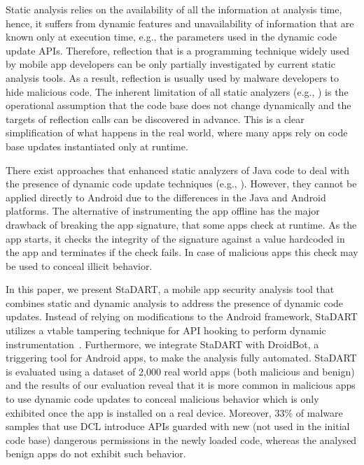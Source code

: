 Static analysis relies on the availability of all the information at analysis time, hence, it suffers  from dynamic features and unavailability of information that are known only at execution time, e.g., the parameters used in the dynamic code update APIs. Therefore, reflection that is a programming technique widely used by mobile app developers can be only partially investigated by current  static analysis tools. As a result, reflection is usually used by malware developers to hide malicious code. The inherent limitation of  all static analyzers  (e.g., \cite{FlowDroid_Arzt2014,Saaf_Hoffmann2013}) is the operational assumption  that the code base does not change dynamically and the targets of reflection calls can be discovered in advance. This is a clear simplification of what happens in the real world, where many apps rely on code base updates instantiated only at runtime.


There exist approaches that enhanced static analyzers of Java code to deal with the presence of dynamic code update techniques (e.g., \cite{TamingReflection_Bodden2011}). However, they cannot be  applied directly to Android due to the differences in the Java and Android platforms. The alternative of instrumenting the app offline has the  major drawback of breaking the app signature, that some apps check  at runtime. As the app starts, it checks the integrity of the signature against  a  value hardcoded in the app and terminates if the check fails. In case of malicious apps this check may be used to conceal illicit behavior. 

In this paper, we present StaDART, a mobile app security analysis tool that combines static and dynamic analysis to address the presence of dynamic code updates. Instead of relying on modifications to the Android framework, StaDART utilizes a vtable tampering technique for API hooking to perform dynamic instrumentation~\cite{costamagna2016artdroid}. Furthermore, we integrate StaDART with DroidBot, a triggering tool for Android apps, to make the analysis  fully automated. StaDART is evaluated using a dataset of 2,000 real world apps (both malicious and benign) and the results of our evaluation reveal that it is more common in malicious apps to use dynamic code updates to conceal malicious behavior which is only exhibited once the app is installed on a real device. Moreover, 33\% of malware samples that use DCL introduce APIs guarded with new (not used in the initial code base) dangerous permissions in the newly loaded code, whereas the analysed benign apps do not exhibit such behavior.  

